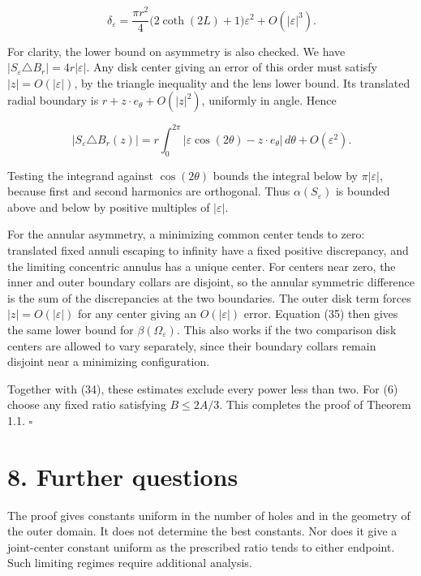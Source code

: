 \documentclass[11pt]{article}
\begin{document}
\[
\delta_\varepsilon=
\frac{\pi r^2}{4}\bigl(2\coth(2L)+1\bigr)\varepsilon^2
+O(|\varepsilon|^3).
\tag{34}
\]

For clarity, the lower bound on asymmetry is also checked. We have
\(|S_\varepsilon\triangle B_r|=4r|\varepsilon|\). Any disk center giving
an error of this order must satisfy \(|z|=O(|\varepsilon|)\), by the
triangle inequality and the lens lower bound. Its translated radial
boundary is \(r+z\cdot e_\theta+O(|z|^2)\), uniformly in angle. Hence

\[
|S_\varepsilon\triangle B_r(z)|
=r\int_0^{2\pi}|\varepsilon\cos(2\theta)-z\cdot e_\theta|\,d\theta
+O(\varepsilon^2).
\tag{35}
\]

Testing the integrand against \(\cos(2\theta)\) bounds the integral
below by \(\pi|\varepsilon|\), because first and second harmonics are
orthogonal. Thus \(\alpha(S_\varepsilon)\) is bounded above and below by
positive multiples of \(|\varepsilon|\).

For the annular asymmetry, a minimizing common center tends to zero:
translated fixed annuli escaping to infinity have a fixed positive
discrepancy, and the limiting concentric annulus has a unique center.
For centers near zero, the inner and outer boundary collars are
disjoint, so the annular symmetric difference is the sum of the
discrepancies at the two boundaries. The outer disk term forces
\(|z|=O(|\varepsilon|)\) for any center giving an \(O(|\varepsilon|)\)
error. Equation (35) then gives the same lower bound for
\(\beta(\Omega_\varepsilon)\). This also works if the two comparison
disk centers are allowed to vary separately, since their boundary
collars remain disjoint near a minimizing configuration.

Together with (34), these estimates exclude every power less than two.
For (6) choose any fixed ratio satisfying \(B\le2A/3\). This completes
the proof of Theorem 1.1. \(\square\)

\section{8. Further questions}\label{further-questions}

The proof gives constants uniform in the number of holes and in the
geometry of the outer domain. It does not determine the best constants.
Nor does it give a joint-center constant uniform as the prescribed ratio
tends to either endpoint. Such limiting regimes require additional
analysis.
\end{document}
